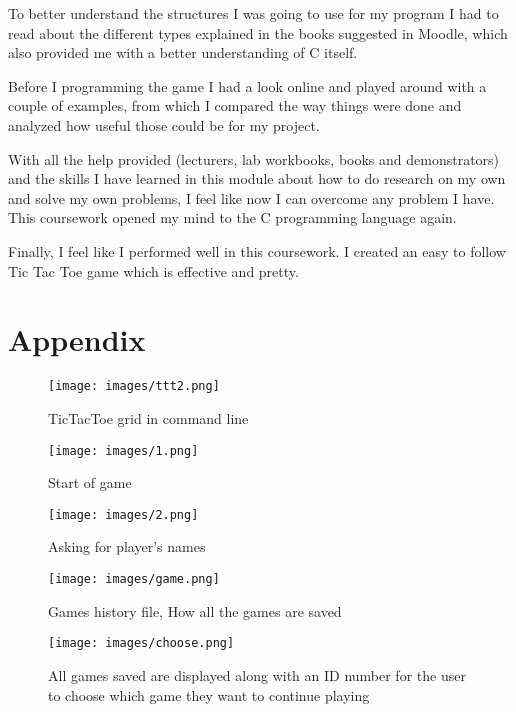 \documentclass[10pt, a4paper]{article}
\begin{document}
To better understand the structures I was going to use for my program I had to read about the different types explained in the books suggested in Moodle, which also provided me with a better understanding of C itself.

Before I programming the game I had a look online and played around with a couple of examples, from which I compared the way things were done and analyzed how useful those could be for my project.

With all the help provided (lecturers, lab workbooks, books and demonstrators) and the skills I have learned in this module about how to do research on my own and solve my own problems, I feel like now I can overcome any problem I have. This coursework opened my mind to the C programming language again.

Finally, I feel like I performed well in this coursework. I created an easy to follow Tic Tac Toe game which is effective and pretty.








\section{Appendix}
\begin{figure}[h!]
    \centering
    \texttt{[image: images/ttt2.png]}
    \caption{TicTacToe grid in command line}
    \label{fig:ttt2}
\end{figure}

\begin{figure}
    \centering
    \texttt{[image: images/1.png]}
    \caption{Start of game}
    \label{fig:players}
\end{figure}

\begin{figure}
    \centering
    \texttt{[image: images/2.png]}
    \caption{Asking for player's names}
    \label{fig:names}
\end{figure}

\begin{figure}
    \centering
    \texttt{[image: images/game.png]}
    \caption{Games history file, How all the games are saved}
    \label{fig:gameHistory}
\end{figure}

\begin{figure}
    \centering
    \texttt{[image: images/choose.png]}
    \caption{All games saved are displayed along with an ID number for the user to choose which game they want to continue playing}
    \label{fig:choose}
\end{figure}
\end{document}
